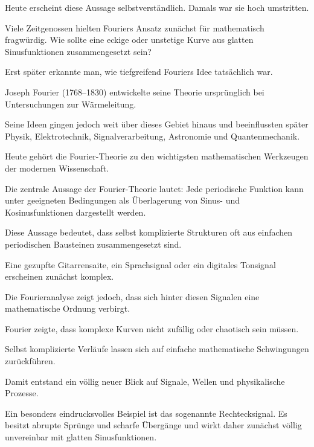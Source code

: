 Heute erscheint diese Aussage selbstverständlich.
Damals war sie hoch umstritten.

Viele Zeitgenossen hielten Fouriers Ansatz zunächst für mathematisch fragwürdig.
Wie sollte eine eckige oder unstetige Kurve
aus glatten Sinusfunktionen zusammengesetzt sein?

Erst später erkannte man,
wie tiefgreifend Fouriers Idee tatsächlich war.

\begin{HistoryBox}
	\small
	\label{box:fourier-joseph-fourier}
	Joseph Fourier (1768--1830) entwickelte seine Theorie ursprünglich
	bei Untersuchungen zur Wärmeleitung.
	
	Seine Ideen gingen jedoch weit über dieses Gebiet hinaus
	und beeinflussten später Physik,
	Elektrotechnik,
	Signalverarbeitung,
	Astronomie
	und Quantenmechanik.
	
	Heute gehört die Fourier-Theorie
	zu den wichtigsten mathematischen Werkzeugen der modernen Wissenschaft.
\end{HistoryBox}

Die zentrale Aussage der Fourier-Theorie lautet:
Jede periodische Funktion kann unter geeigneten Bedingungen als Überlagerung
von Sinus- und Kosinusfunktionen dargestellt werden.

Diese Aussage bedeutet,
dass selbst komplizierte Strukturen
oft aus einfachen periodischen Bausteinen zusammengesetzt sind.

Eine gezupfte Gitarrensaite,
ein Sprachsignal
oder ein digitales Tonsignal
erscheinen zunächst komplex.

Die Fourieranalyse zeigt jedoch,
dass sich hinter diesen Signalen
eine mathematische Ordnung verbirgt.

\begin{DidacticBox}
	\small
	\label{box:fourier-revolutionaere-idee}
	Fourier zeigte,
	dass komplexe Kurven nicht zufällig oder chaotisch sein müssen.
	
	Selbst komplizierte Verläufe lassen sich
	auf einfache mathematische Schwingungen zurückführen.
	
	Damit entstand ein völlig neuer Blick
	auf Signale,
	Wellen
	und physikalische Prozesse.
\end{DidacticBox}

Ein besonders eindrucksvolles Beispiel ist das sogenannte Rechtecksignal.
Es besitzt abrupte Sprünge und scharfe Übergänge
und wirkt daher zunächst völlig unvereinbar
mit glatten Sinusfunktionen.

